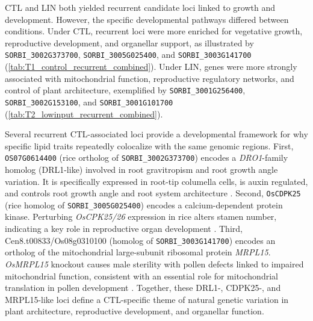 \documentclass[9pt,twocolumn,twoside]{rilabRxiv}
\begin{document}
CTL and LIN both yielded recurrent candidate loci linked to growth and development. However, the specific developmental pathways differed between conditions. Under CTL, recurrent loci were more enriched for vegetative growth, reproductive development, and organellar support, as illustrated by \texttt{SORBI\_3002G373700}, \texttt{SORBI\_3005G025400}, and \texttt{SORBI\_3003G141700} (\ref{tab:T1_control_recurrent_combined}). Under LIN, genes were more strongly associated with mitochondrial function, reproductive regulatory networks, and control of plant architecture, exemplified by \texttt{SORBI\_3001G256400}, \texttt{SORBI\_3002G153100}, and \texttt{SORBI\_3001G101700} (\ref{tab:T2_lowinput_recurrent_combined}).

Several recurrent CTL-associated loci provide a developmental framework for why specific lipid traits repeatedly colocalize with the same genomic regions. First, \texttt{OS07G0614400} (rice ortholog of \texttt{SORBI\_3002G373700}) encodes a \textit{DRO1}-family homolog (DRL1-like) involved in root gravitropism and root growth angle variation. It is specifically expressed in root-tip columella cells, is auxin regulated, and controls root growth angle and root system architecture \citep{Kitomi2020}. Second, \texttt{OsCDPK25} (rice homolog of \texttt{SORBI\_3005G025400}) encodes a calcium-dependent protein kinase. Perturbing \textit{OsCPK25/26} expression in rice alters stamen number, indicating a key role in reproductive organ development \citep{Zhang2014}. Third, Cen8.t00833/Os08g0310100 (homolog of \texttt{SORBI\_3003G141700}) encodes an ortholog of the mitochondrial large-subunit ribosomal protein \textit{MRPL15}. \textit{OsMRPL15} knockout causes male sterility with pollen defects linked to impaired mitochondrial function, consistent with an essential role for mitochondrial translation in pollen development \citep{Xie2023}. Together, these DRL1-, CDPK25-, and MRPL15-like loci define a CTL-specific theme of natural genetic variation in plant architecture, reproductive development, and organellar function.
\end{document}
